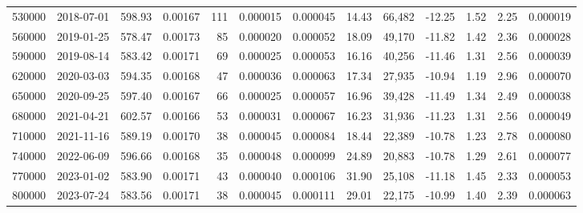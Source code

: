 \begin{tabular}{rlllrrrllllll}
\toprule
\midrule
530000 & 2018-07-01 & 598.93 & 0.00167 & 111 & 0.000015 & 0.000045 & 14.43 & 66,482 & -12.25 & 1.52 & 2.25 & 0.000019 \\
560000 & 2019-01-25 & 578.47 & 0.00173 & 85 & 0.000020 & 0.000052 & 18.09 & 49,170 & -11.82 & 1.42 & 2.36 & 0.000028 \\
590000 & 2019-08-14 & 583.42 & 0.00171 & 69 & 0.000025 & 0.000053 & 16.16 & 40,256 & -11.46 & 1.31 & 2.56 & 0.000039 \\
620000 & 2020-03-03 & 594.35 & 0.00168 & 47 & 0.000036 & 0.000063 & 17.34 & 27,935 & -10.94 & 1.19 & 2.96 & 0.000070 \\
650000 & 2020-09-25 & 597.40 & 0.00167 & 66 & 0.000025 & 0.000057 & 16.96 & 39,428 & -11.49 & 1.34 & 2.49 & 0.000038 \\
680000 & 2021-04-21 & 602.57 & 0.00166 & 53 & 0.000031 & 0.000067 & 16.23 & 31,936 & -11.23 & 1.31 & 2.56 & 0.000049 \\
710000 & 2021-11-16 & 589.19 & 0.00170 & 38 & 0.000045 & 0.000084 & 18.44 & 22,389 & -10.78 & 1.23 & 2.78 & 0.000080 \\
740000 & 2022-06-09 & 596.66 & 0.00168 & 35 & 0.000048 & 0.000099 & 24.89 & 20,883 & -10.78 & 1.29 & 2.61 & 0.000077 \\
770000 & 2023-01-02 & 583.90 & 0.00171 & 43 & 0.000040 & 0.000106 & 31.90 & 25,108 & -11.18 & 1.45 & 2.33 & 0.000053 \\
800000 & 2023-07-24 & 583.56 & 0.00171 & 38 & 0.000045 & 0.000111 & 29.01 & 22,175 & -10.99 & 1.40 & 2.39 & 0.000063 \\
\bottomrule
\end{tabular}
